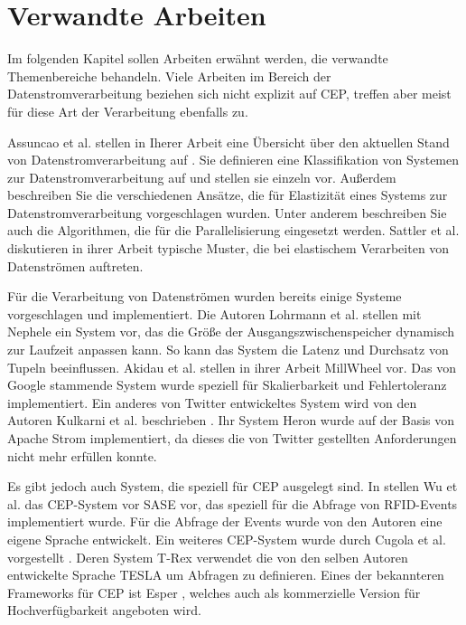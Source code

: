 \chapter{Verwandte Arbeiten}
Im folgenden Kapitel sollen Arbeiten erwähnt werden, die verwandte Themenbereiche behandeln.
Viele Arbeiten im Bereich der Datenstromverarbeitung beziehen sich nicht explizit auf CEP, treffen aber meist für diese Art der Verarbeitung ebenfalls zu.

Assuncao et al. stellen in Iherer Arbeit eine Übersicht über den aktuellen Stand von Datenstromverarbeitung auf \cite{de_assuncao_distributed_2017}.
Sie definieren eine Klassifikation von Systemen zur Datenstromverarbeitung auf und stellen sie einzeln vor.
Außerdem beschreiben Sie die verschiedenen Ansätze, die für Elastizität eines Systems zur Datenstromverarbeitung vorgeschlagen wurden.
Unter anderem beschreiben Sie auch die Algorithmen, die für die Parallelisierung eingesetzt werden.
Sattler et al. \cite{sattler_towards_2013} diskutieren in ihrer Arbeit typische Muster, die bei elastischem Verarbeiten von Datenströmen auftreten.

Für die Verarbeitung von Datenströmen wurden bereits einige Systeme vorgeschlagen und implementiert.
Die Autoren Lohrmann et al. \cite{lohrmann_nephele_2014} stellen mit Nephele ein System vor, das die Größe der Ausgangszwischenspeicher dynamisch zur Laufzeit anpassen kann.
So kann das System die Latenz und Durchsatz von Tupeln beeinflussen.
Akidau et al. \cite{akidau_millwheel:_2013} stellen in ihrer Arbeit MillWheel vor.
Das von Google stammende System wurde speziell für Skalierbarkeit und Fehlertoleranz implementiert.
Ein anderes von Twitter entwickeltes System wird von den Autoren Kulkarni et al. beschrieben \cite{kulkarni_twitter_2015}.
Ihr System Heron wurde auf der Basis von Apache Strom implementiert, da dieses die von Twitter gestellten Anforderungen nicht mehr erfüllen konnte.

Es gibt jedoch auch System, die speziell für CEP ausgelegt sind.
In \cite{wu_high-performance_2006} stellen Wu et al. das CEP-System vor SASE vor, das speziell für die Abfrage von RFID-Events implementiert wurde.
Für die Abfrage der Events wurde von den Autoren eine eigene Sprache entwickelt.
Ein weiteres CEP-System wurde durch Cugola et al. vorgestellt \cite{cugola_complex_2012}.
Deren System T-Rex verwendet die von den selben Autoren entwickelte Sprache TESLA \cite{cugola_tesla:_2010} um Abfragen zu definieren. 
Eines der bekannteren Frameworks für CEP ist Esper \cite{noauthor_home_nodate}, welches auch als kommerzielle Version für Hochverfügbarkeit angeboten wird.

